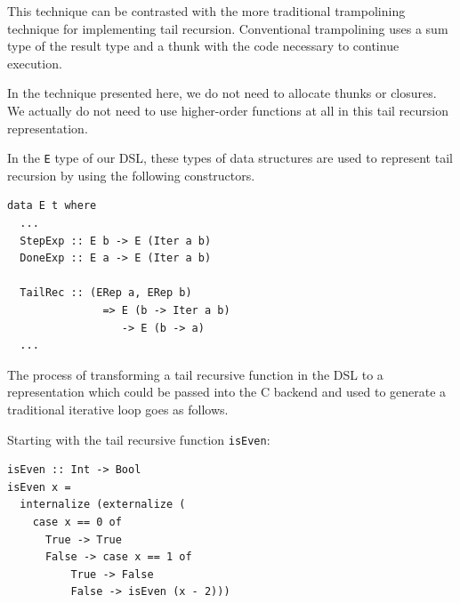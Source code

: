 \documentclass[sigplan,anonymous,review]{acmart}
\newcommand{\ttt}{\texttt}
\begin{document}





This technique can be contrasted with the more traditional trampolining
technique for implementing tail recursion. Conventional trampolining uses a
sum type of the result type and a thunk with the code necessary to continue
execution.~\cite{Ganz:99:Trampolined}

In the technique presented here, we do not need to allocate thunks or closures.
We actually do not need to use higher-order functions at all in this tail recursion
representation.

In the \ttt{E} type of our DSL, these types of data structures are used to represent tail 
recursion by using the following constructors.   

\begin{lstlisting}
data E t where
  ...
  StepExp :: E b -> E (Iter a b)
  DoneExp :: E a -> E (Iter a b)

  TailRec :: (ERep a, ERep b)
               => E (b -> Iter a b)
                  -> E (b -> a)
  ...
\end{lstlisting}

The process of transforming a tail recursive function in the DSL to a 
representation which could be passed into the C backend and used
to generate a traditional iterative loop goes as follows.

Starting with the tail recursive function  \ttt{isEven}:

\begin{lstlisting}
isEven :: Int -> Bool
isEven x =
  internalize (externalize (
    case x == 0 of
      True -> True
      False -> case x == 1 of
          True -> False
          False -> isEven (x - 2)))
\end{lstlisting}

\end{document}
